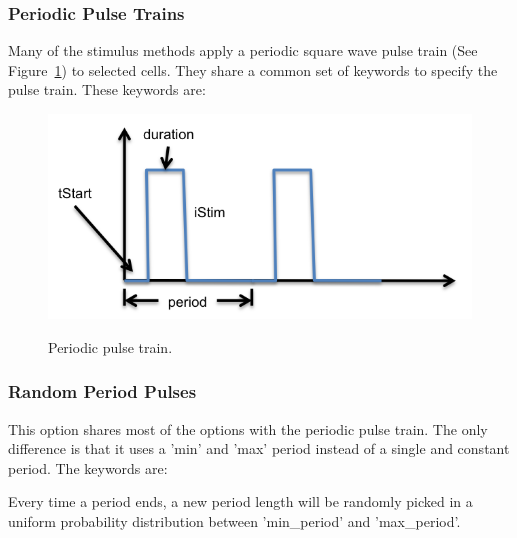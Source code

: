 \documentclass{article}
\begin{document}
\subsubsection{Periodic Pulse Trains}
\label{sssec:pulseTrains}
Many of the stimulus methods apply a periodic square wave pulse train
(See Figure~\ref{fig:pulseTrain}) to selected cells.  They share a
common set of keywords to specify the pulse train.  These keywords are:
\begin{keywords}
\end{keywords}

\begin{figure}
  {\centering\includegraphics{graphics/pulseTrain.png}}
  \caption{Periodic pulse train.}
  \label{fig:pulseTrain}
\end{figure}

\subsubsection{Random Period Pulses}
\label{sssec:randomPeriodPulse}
This option shares most of the options with the periodic pulse train.
The only difference is that it uses a 'min' and 'max' period instead of a single and constant period.
The keywords are:
\begin{keywords}
\end{keywords}
Every time a period ends, a new period length will be randomly picked 
in a uniform probability distribution between 'min\_period' and 'max\_period'.
\end{document}
